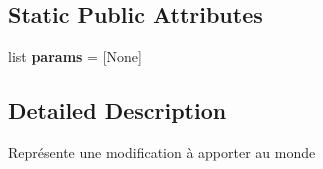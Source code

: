 \subsection*{\-Static \-Public \-Attributes}
\begin{DoxyCompactItemize}
\item 
\hypertarget{classorders_1_1_order_a8c362161ec6b78b5a5a04cf63ba79a0d}{list {\bfseries params} = \mbox{[}\-None\mbox{]}}\label{classorders_1_1_order_a8c362161ec6b78b5a5a04cf63ba79a0d}

\end{DoxyCompactItemize}


\subsection{\-Detailed \-Description}
\begin{DoxyVerb}Représente une modification à apporter au monde \end{DoxyVerb}
 

